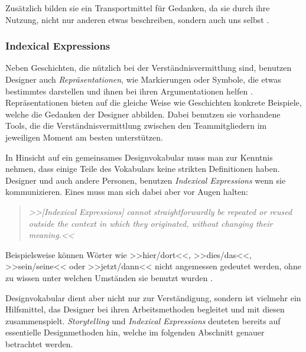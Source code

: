 \medskip Zusätzlich bilden sie ein Transportmittel für Gedanken, da sie durch ihre Nutzung, nicht nur anderen etwas beschreiben, sondern auch uns selbst \citep{Norman:1994}.

\subsubsection{Indexical Expressions} 
Neben Geschichten, die nützlich bei der Verständnisvermittlung sind, benutzen Designer auch \emph{Repräsentationen}, wie Markierungen oder Symbole, die etwas bestimmtes darstellen und ihnen bei ihren Argumentationen helfen \citep{Norman:1994}. Repräsentationen bieten auf die gleiche Weise wie Geschichten konkrete Beispiele, welche die Gedanken der Designer abbilden. Dabei benutzen sie vorhandene Tools, die die Verständnisvermittlung zwischen den Teammitgliedern im jeweiligen Moment am besten unterstützen.

\medskip In Hinsicht auf ein gemeinsames Designvokabular muss man zur Kenntnis nehmen, dass einige Teile des Vokabulars keine strikten Definitionen haben. Designer und auch andere Personen, benutzen \emph{Indexical Expressions} wenn sie kommunizieren. Eines muss man sich dabei aber vor Augen halten:

\begin{quote}
	\textsl{>>[Indexical Expressions] cannot straightforwardly be repeated or reused outside the context in which they originated, without changing their meaning.<<}
\begin{flushright}\citep{Kristoffersen:1999}\end{flushright}
\end{quote}

Beispielsweise  können Wörter wie >>hier/dort<<, >>dies/das<<, >>sein/seine<< oder >>jetzt/dann<< nicht angemessen gedeutet werden, ohne zu wissen unter welchen Umständen sie benutzt wurden \citep{Larsson:2003}.

\medskip Designvokabular dient aber nicht nur zur Verständigung, sondern ist vielmehr ein Hilfsmittel, das Designer bei ihren Arbeitsmethoden begleitet und mit diesen zusammenspielt. \emph{Storytelling} und \emph{Indexical Expressions} deuteten bereits auf essentielle Designmethoden hin, welche im folgenden Abschnitt genauer betrachtet werden.

